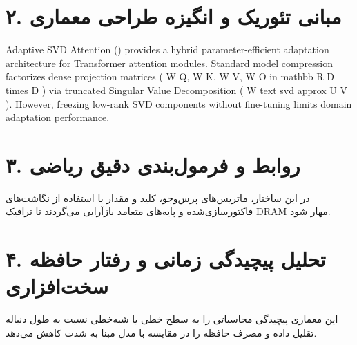 \documentclass[12pt,a4paper]{article}
\begin{document}
\section*{۲. مبانی تئوریک و انگیزه طراحی معماری}
Adaptive SVD Attention () provides a hybrid parameter-efficient adaptation architecture for Transformer attention modules. Standard model compression factorizes dense projection matrices ( W Q, W K, W V, W O in mathbb R D times D ) via truncated Singular Value Decomposition ( W text svd approx U V ). However, freezing low-rank SVD components without fine-tuning limits domain adaptation performance.

\section*{۳. روابط و فرمول‌بندی دقیق ریاضی}
در این ساختار، ماتریس‌های پرس‌وجو، کلید و مقدار با استفاده از نگاشت‌های فاکتورسازی‌شده و پایه‌های متعامد بازآرایی می‌گردند تا ترافیک DRAM مهار شود.

\section*{۴. تحلیل پیچیدگی زمانی و رفتار حافظه سخت‌افزاری}
این معماری پیچیدگی محاسباتی را به سطح خطی یا شبه‌خطی نسبت به طول دنباله تقلیل داده و مصرف حافظه را در مقایسه با مدل مبنا به شدت کاهش می‌دهد.
\end{document}
